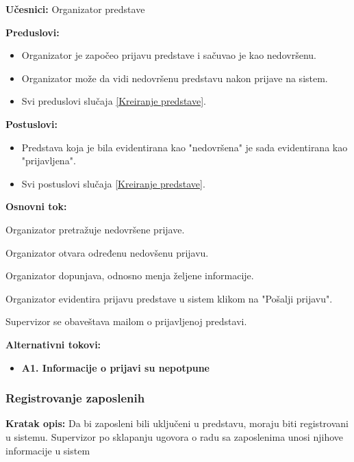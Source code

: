 \documentclass[a4paper]{article}
\begin{document}
\noindent\textbf{Učesnici:} Organizator predstave

\noindent\textbf{Preduslovi:}
  \begin{itemize}
    \item Organizator je započeo prijavu predstave i sačuvao je kao nedovršenu.
    \item Organizator može da vidi nedovršenu predstavu nakon prijave na sistem.
    \item Svi preduslovi slučaja \ref{Kreiranje predstave}.
  \end{itemize}

\noindent\textbf{Postuslovi:} 
  \begin{itemize}
    \item Predstava koja je bila evidentirana kao "nedovršena" je sada evidentirana kao "prijavljena".
    \item Svi postuslovi slučaja \ref{Kreiranje predstave}.
  \end{itemize}

\noindent\textbf{Osnovni tok:}
  \begin{legal}
    \item Organizator pretražuje nedovršene prijave.
    \item Organizator otvara određenu nedovšenu prijavu. 
    \item Organizator dopunjava, odnosno menja željene informacije.
    \item Organizator evidentira prijavu predstave u sistem klikom na "Pošalji prijavu". 
    \item Supervizor se obaveštava mailom o prijavljenoj predstavi.
  \end{legal}

\noindent\textbf{Alternativni tokovi:} 
\begin{itemize}
  \item \textbf{A1. Informacije o prijavi su nepotpune} 
\end{itemize}


\subsubsection{Registrovanje zaposlenih} \label{Registrovanje zaposlenih}
\noindent\textbf{Kratak opis:} Da bi zaposleni bili uključeni u predstavu, moraju biti registrovani u sistemu. Supervizor po sklapanju ugovora o radu sa zaposlenima unosi njihove informacije u sistem
\end{document}
